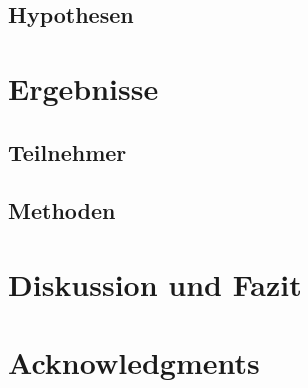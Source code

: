
    \section{Hypothesen}\label{sec:hypo}

\chapter{Ergebnisse}\label{}
    \section{Teilnehmer}\label{}
    \section{Methoden}\label{}

\chapter{Diskussion und Fazit}\label{}

\chapter{Acknowledgments}\label{}


